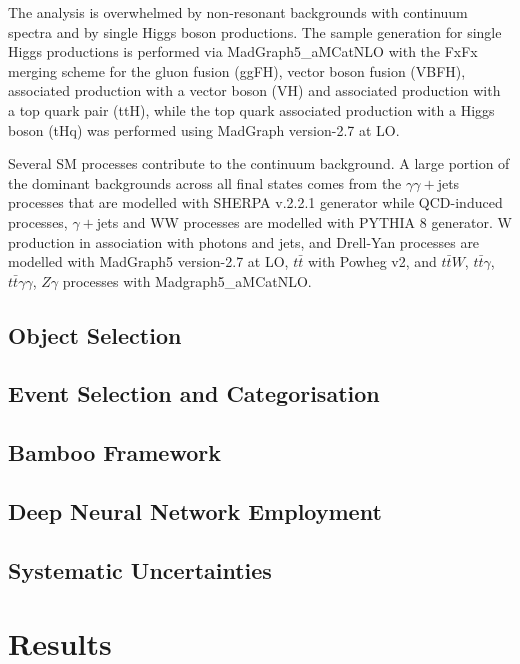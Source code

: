The analysis is overwhelmed by non-resonant backgrounds with continuum \mgg spectra and by single Higgs boson productions. The sample generation for single Higgs productions is performed via MadGraph5\_aMCatNLO \cite{Alwall2014, Artoisenet2013} with the FxFx merging scheme \cite{Frederix2012} for the gluon fusion (ggFH), vector boson fusion (VBFH), associated production with a vector boson (VH) and associated production with a top quark pair (ttH), while the top quark associated production  with a Higgs boson (tHq) was performed using MadGraph version-2.7 at LO.

Several SM processes contribute to the continuum background. A large portion of the dominant backgrounds across all final states comes from the $\gamma\gamma+$jets processes that are modelled with SHERPA v.2.2.1 generator \cite{10.21468/SciPostPhys.7.3.034}while QCD-induced processes, $\gamma+$jets and WW processes are modelled with PYTHIA 8 generator. W production in association with photons and jets, and Drell-Yan processes are modelled with MadGraph5 version-2.7 at LO, $t\bar t$ with Powheg v2, and $t\bar tW$, $t\bar t\gamma$, $t\bar t\gamma\gamma$, $Z\gamma$ processes with Madgraph5\_aMCatNLO.

\subsection{Object Selection}

\subsection{Event Selection and Categorisation}

\subsection{Bamboo Framework}

\subsection{Deep Neural Network Employment}

\subsection{Systematic Uncertainties}

\section{Results}